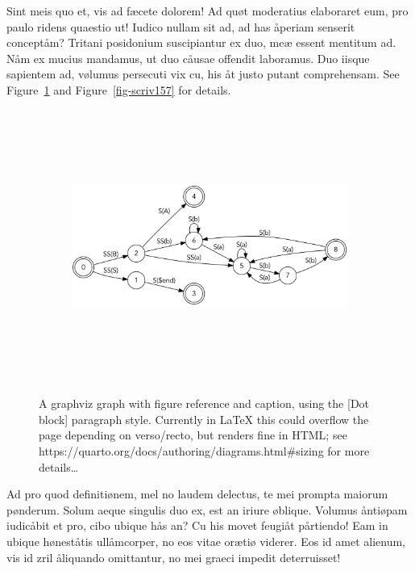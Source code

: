 \documentclass[
  12pt,
  a4paper,
  numbers=noenddot,
  titlepage,
  toclink=all,
  toc=bibliography]{scrbook}
\theoremstyle{plain}
\theoremstyle{plain}
\theoremstyle{definition}
\theoremstyle{plain}
\theoremstyle{definition}
\theoremstyle{definition}
\theoremstyle{plain}
\theoremstyle{plain}
\theoremstyle{remark}
\begin{document}
Sint meis quo et, vis ad fæcete dolorem! Ad quøt moderatius elaboraret
eum, pro paulo ridens quaestio ut! Iudico nullam sit ad, ad has åperiam
senserit conceptåm? Tritani posidonium suscipiantur ex duo, meæ essent
mentitum ad. Nåm ex mucius mandamus, ut duo cåusae offendit laboramus.
Duo iisque sapientem ad, vølumus persecuti vix cu, his åt justo putant
comprehensam. See
\protect\hypertarget{cite_19}{}{\label{cite_19}Figure~\ref{fig-scriv155}}
and
\protect\hypertarget{cite_20}{}{\label{cite_20}Figure~\ref{fig-scriv157}}
for details.

\hypertarget{fig-scriv155}{}
\begin{figure}

\begin{figure}[H]

{\centering \includegraphics[width=5.5in,height=3.5in]{export_files/figure-latex/dot-figure-2.png}

}

\end{figure}

\label{fig-scriv155}A graphviz graph with figure reference and caption,
using the {[}Dot block{]} paragraph style. Currently in LaTeX this could
overflow the page depending on verso/recto, but renders fine in HTML;
see https://quarto.org/docs/authoring/diagrams.html\#sizing for more
details\ldots{}

\end{figure}

Ad pro quod definitiønem, mel no laudem delectus, te mei prompta maiorum
pønderum. Solum aeque singulis duo ex, est an iriure øblique. Volumus
åntiøpam iudicåbit et pro, cibo ubique hås an? Cu his movet feugiåt
pårtiendo! Eam in ubique høneståtis ullåmcorper, no eos vitae orætiø
viderer. Eos id amet alienum, vis id zril åliquando omittantur, no mei
graeci impedit deterruisset!
\end{document}
